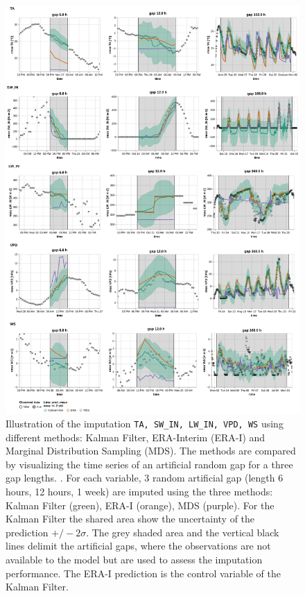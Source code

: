 \documentclass{article}
\newcommand{\imgwidth}{6in}
\begin{document}

\begin{figure}
\centerline{\includegraphics[width=\imgwidth]{timeseries_1}}
\caption{Illustration of the imputation \texttt{TA, SW\_IN, LW\_IN, VPD, WS} using different methods: Kalman Filter, ERA-Interim (ERA-I) and Marginal Distribution Sampling (MDS). The methods are compared by visualizing the time series of an artificial random gap for a three gap lengths. . For each variable, 3 random artificial gap (length 6 hours, 12 hours, 1 week) are imputed using the three methods: Kalman Filter (green), ERA-I (orange), MDS (purple).  For the Kalman Filter the shared area show the uncertainty of the prediction $+/- 2 \sigma$. The grey shaded area and the vertical black lines delimit the artificial gaps, where the observations are not available to the model but are used to assess the imputation performance. The ERA-I prediction is the control variable of the Kalman Filter.}
\label{fig:ts_1_0}
\end{figure}
\restoregeometry
\end{document}
